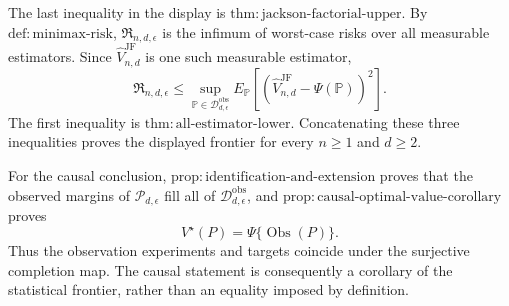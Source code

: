 The last inequality in the display is \(\mathrm{thm:jackson\mbox{-}factorial\mbox{-}upper}\).  By \(\mathrm{def:minimax\mbox{-}risk}\), \(\mathfrak R_{n,d,\epsilon}\) is the infimum of worst-case risks over all measurable estimators.  Since \(\widehat V_{n,d}^{\mathrm{JF}}\) is one such measurable estimator,
\[
 \mathfrak R_{n,d,\epsilon}
 \leq\sup_{\mathbb P\in\mathcal D_{d,\epsilon}^{\mathrm{obs}}}
 E_{\mathbb P}\left[
 (\widehat V_{n,d}^{\mathrm{JF}}-\Psi(\mathbb P))^2\right].
\]
The first inequality is \(\mathrm{thm:all\mbox{-}estimator\mbox{-}lower}\).  Concatenating these three inequalities proves the displayed frontier for every \(n\geq1\) and \(d\geq2\).

For the causal conclusion, \(\mathrm{prop:identification\mbox{-}and\mbox{-}extension}\) proves that the observed margins of \(\mathcal P_{d,\epsilon}\) fill all of \(\mathcal D_{d,\epsilon}^{\mathrm{obs}}\), and \(\mathrm{prop:causal\mbox{-}optimal\mbox{-}value\mbox{-}corollary}\) proves
\[
 V^\star(P)=\Psi\{\operatorname{Obs}(P)\}.
\]
Thus the observation experiments and targets coincide under the surjective completion map.  The causal statement is consequently a corollary of the statistical frontier, rather than an equality imposed by definition.